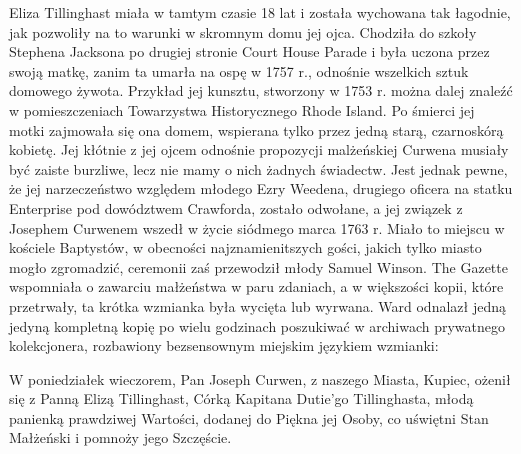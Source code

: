 Eliza Tillinghast miała w tamtym czasie 18 lat i została wychowana tak łagodnie, jak pozwoliły na to warunki w skromnym domu jej ojca. Chodziła do szkoły Stephena Jacksona po drugiej stronie Court House Parade i była uczona przez swoją matkę, zanim ta umarła na ospę w 1757 r., odnośnie wszelkich sztuk domowego żywota. Przykład jej kunsztu, stworzony w 1753 r. można dalej znaleźć w pomieszczeniach Towarzystwa Historycznego Rhode Island. Po śmierci jej motki zajmowała się ona domem, wspierana tylko przez jedną starą, czarnoskórą kobietę. Jej kłótnie z jej ojcem odnośnie propozycji malżeńskiej Curwena musiały być zaiste burzliwe, lecz nie mamy o nich żadnych świadectw. Jest jednak pewne, że jej narzeczeństwo względem młodego Ezry Weedena, drugiego oficera na statku Enterprise pod dowództwem Crawforda, zostało odwołane, a jej związek z Josephem Curwenem wszedł w życie siódmego marca 1763 r. Miało to miejscu w kościele Baptystów, w obecności najznamienitszych gości, jakich tylko miasto mogło zgromadzić, ceremonii zaś przewodził młody Samuel Winson. The Gazette wspomniała o zawarciu małżeństwa w paru zdaniach, a w większości kopii, które przetrwały, ta krótka wzmianka była wycięta lub wyrwana. Ward odnalazł jedną jedyną kompletną kopię po wielu godzinach poszukiwać w archiwach prywatnego kolekcjonera, rozbawiony bezsensownym miejskim językiem wzmianki:

\begin{displayquote}

W poniedziałek wieczorem, Pan Joseph Curwen, z naszego Miasta, Kupiec, ożenił się z Panną Elizą Tillinghast, Córką Kapitana Dutie'go Tillinghasta, młodą panienką prawdziwej Wartości, dodanej do Piękna jej Osoby, co uświętni Stan Małżeński i pomnoży jego Szczęście.

\end{displayquote}


